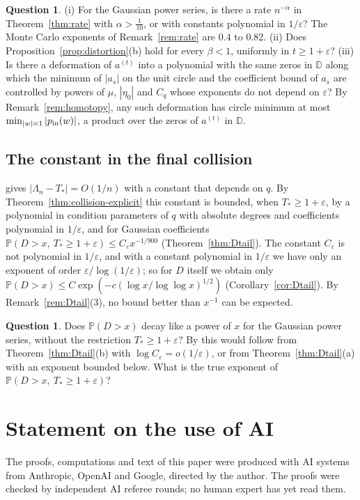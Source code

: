\documentclass[11pt]{amsart}
\theoremstyle{definition}
\newtheorem{question}[theorem]{Question}
\theoremstyle{remark}
\numberwithin{equation}{section}
\newcommand{\D}{\mathbb{D}}
\newcommand{\PP}{\mathbb{P}}
\newcommand{\eps}{\varepsilon}
\begin{document}
\begin{question}\label{q:distortion}
(i) For the Gaussian power series, is there a rate $n^{-\alpha}$ in Theorem~\ref{thm:rate} with $\alpha>\frac1{10}$, or with constants polynomial in $1/\eps$? The Monte Carlo exponents of Remark~\ref{rem:rate} are $0.4$ to $0.82$. (ii) Does Proposition~\ref{prop:distortion}(b) hold for every $\beta<1$, uniformly in $t\ge1+\eps$? (iii) Is there a deformation of $a^{(t)}$ into a polynomial with the same zeros in $\D$ along which the minimum of $|a_s|$ on the unit circle and the coefficient bound of $a_s$ are controlled by powers of $\mu$, $|\eta_0|$ and $C_q$ whose exponents do not depend on $\eps$? By Remark~\ref{rem:homotopy}, any such deformation has circle minimum at most $\min_{|w|=1}|p_{\rm in}(w)|$, a product over the zeros of $a^{(t)}$ in $\D$.
\end{question}



\subsection{The constant in the final collision}
\cite[Theorem~\ref{M-thm:collision}]{Main} gives $|\Lambda_n-T_*|=O(1/n)$ with a constant that depends on $q$. By Theorem~\ref{thm:collision-explicit} this constant is bounded, when $T_*\ge1+\eps$, by a polynomial in condition parameters of $q$ with absolute degrees and coefficients polynomial in $1/\eps$, and for Gaussian coefficients $\PP(D>x,\ T_*\ge1+\eps)\le C_\eps x^{-1/900}$ (Theorem~\ref{thm:Dtail}). The constant $C_\eps$ is not polynomial in $1/\eps$, and with a constant polynomial in $1/\eps$ we have only an exponent of order $\eps/\log(1/\eps)$; so for $D$ itself we obtain only $\PP(D>x)\le C\exp(-c(\log x/\log\log x)^{1/2})$ (Corollary~\ref{cor:Dtail}). By Remark~\ref{rem:Dtail}(3), no bound better than $x^{-1}$ can be expected.

\begin{question}\label{q:Dtail}
Does $\PP(D>x)$ decay like a power of $x$ for the Gaussian power series, without the restriction $T_*\ge1+\eps$? By \cite[Theorem~\ref{M-thm:sharp}]{Main} this would follow from Theorem~\ref{thm:Dtail}(b) with $\log C_\eps=o(1/\eps)$, or from Theorem~\ref{thm:Dtail}(a) with an exponent bounded below. What is the true exponent of $\PP(D>x,\ T_*\ge1+\eps)$?
\end{question}


\section*{Statement on the use of AI}
The proofs, computations and text of this paper were produced with AI systems from Anthropic, OpenAI and Google, directed by the author. The proofs were checked by independent AI referee rounds; no human expert has yet read them.
\end{document}
